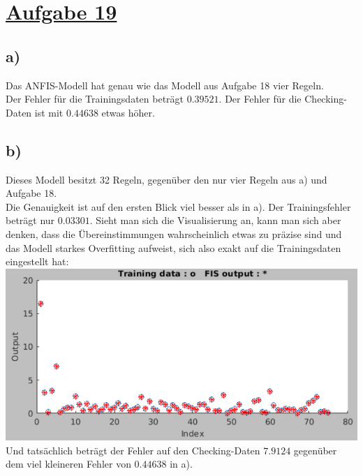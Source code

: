 \section*{\underline{Aufgabe 19}}

\subsection*{a)}

Das ANFIS-Modell hat genau wie das Modell aus Aufgabe 18 vier Regeln.\\


Der Fehler für die Trainingsdaten beträgt $0.39521$. Der Fehler für die Checking-Daten ist mit $0.44638$ etwas höher.


\subsection*{b)}

Dieses Modell besitzt 32 Regeln, gegenüber den nur vier Regeln aus a) und Aufgabe 18.\\


Die Genauigkeit ist auf den ersten Blick viel besser als in a). Der Trainingsfehler beträgt nur $0.03301$. Sieht man sich die Visualisierung an, kann man sich aber denken, dass die Übereinstimmungen wahrscheinlich etwas zu präzise sind und das Modell starkes Overfitting aufweist, sich also exakt auf die Trainingsdaten eingestellt hat:\\

\includegraphics[width=\textwidth]{part/grid_train.png}\\

Und tatsächlich beträgt der Fehler auf den Checking-Daten $7.9124$ gegenüber dem viel kleineren Fehler von $0.44638$ in a).

